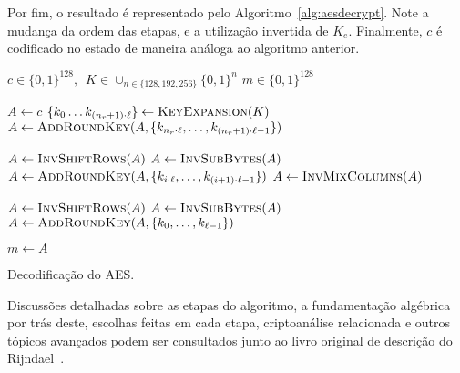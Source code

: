 \documentclass{ufsctex/ufsctex}
\newcommand{\binwds}[1]{\{0, 1\}^{#1}}
\begin{document}
Por fim, o resultado é representado pelo Algoritmo~\ref{alg:aesdecrypt}. Note a
mudança da ordem das etapas, e a utilização invertida de $K_{e}$. Finalmente,
$c$ é codificado no estado de maneira análoga ao algoritmo anterior.

\begin{algorithm}
  \begin{algorithmic}
    \REQUIRE{}  $c \in \binwds{128}, \enspace
      K \in \cup_{n \in \{128, 192, 256\}} \binwds{n}$
    \ENSURE{}  $m \in \binwds{128}$ 

    \STATE{}  $A \leftarrow c$
    \STATE{}  $\{k_{0} \dots k_{(n_{r} + 1) \cdot \ell}\}
      \leftarrow \textsc{KeyExpansion}(K)$
    \STATE{}  $A \leftarrow \textsc{AddRoundKey}(A,
      \{k_{n_{r} \cdot \ell}, \dots, k_{(n_{r} + 1) \cdot \ell - 1}\})$

      \STATE{}  $A \leftarrow \textsc{InvShiftRows}(A)$
      \STATE{}  $A \leftarrow \textsc{InvSubBytes}(A)$
      \STATE{}  $A \leftarrow \textsc{AddRoundKey}(A,
        \{k_{i \cdot \ell}, \dots, k_{(i + 1) \cdot \ell - 1}\})$
      \STATE{}  $A \leftarrow \textsc{InvMixColumns}(A)$
    \ENDFOR{}

    \STATE{}  $A \leftarrow \textsc{InvShiftRows}(A)$
    \STATE{}  $A \leftarrow \textsc{InvSubBytes}(A)$
    \STATE{}  $A \leftarrow \textsc{AddRoundKey}(A,
      \{k_{0}, \dots, k_{\ell - 1}\})$

    \STATE{}  $m \leftarrow A$
  \end{algorithmic}
  \caption{Decodificação do AES.}\label{alg:aesdecrypt}
\end{algorithm}

Discussões detalhadas sobre as etapas do algoritmo, a fundamentação algébrica
por trás deste, escolhas feitas em cada etapa, criptoanálise relacionada e
outros tópicos avançados podem ser consultados junto ao livro original de
descrição do Rijndael~\cite{Daemen:book:2002}.
\end{document}
